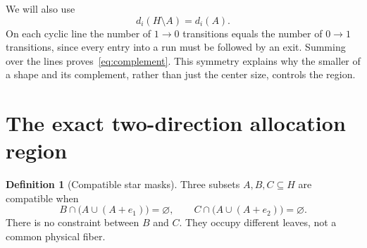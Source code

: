\documentclass[11pt,a4paper]{article}
\theoremstyle{definition}
\newtheorem{definition}[theorem]{Definition}
\theoremstyle{remark}
\begin{document}
We will also use
\begin{equation}\label{eq:complement}
 d_i(H\setminus A)=d_i(A).
\end{equation}
On each cyclic line the number of $1\to0$ transitions equals the number of
$0\to1$ transitions, since every entry into a run must be followed by an
exit. Summing over the lines proves~\eqref{eq:complement}. This symmetry
explains why the smaller of a shape and its complement, rather than just
the center size, controls the region.

\section{The exact two-direction allocation region}
\begin{definition}[Compatible star masks]
Three subsets $A,B,C\subseteq H$ are compatible when
\begin{equation}\label{eq:compat}
 B\cap\bigl(A\cup(A+e_1)\bigr)=\varnothing,
 \qquad
 C\cap\bigl(A\cup(A+e_2)\bigr)=\varnothing.
\end{equation}
There is no constraint between $B$ and $C$. They occupy different leaves,
not a common physical fiber.
\end{definition}
\end{document}
